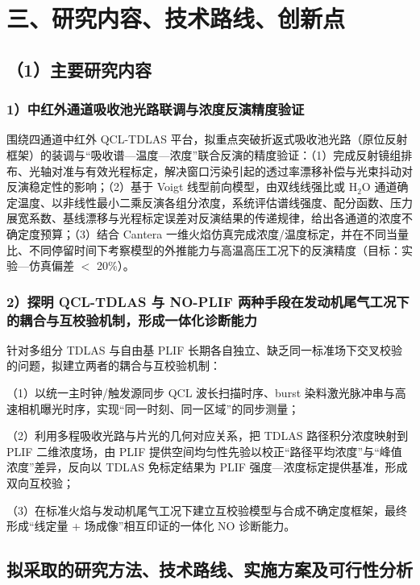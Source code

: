 
\chapter{三、研究内容、技术路线、创新点}

\section{（1）主要研究内容}

\subsection{1）中红外通道吸收池光路联调与浓度反演精度验证}

围绕四通道中红外 QCL-TDLAS 平台，拟重点突破折返式吸收池光路（原位反射框架）的装调与``吸收谱—温度—浓度''联合反演的精度验证：（1）完成反射镜组排布、光轴对准与有效光程标定，解决窗口污染引起的透过率漂移补偿与光束抖动对反演稳定性的影响；（2）基于 Voigt 线型前向模型，由双线线强比或 H$_2$O 通道确定温度、以非线性最小二乘反演各组分浓度，系统评估谱线强度、配分函数、压力展宽系数、基线漂移与光程标定误差对反演结果的传递规律，给出各通道的浓度不确定度预算；（3）结合 Cantera 一维火焰仿真完成浓度/温度标定，并在不同当量比、不同停留时间下考察模型的外推能力与高温高压工况下的反演精度（目标：实验—仿真偏差 $<$ 20\%）。

\subsection{2）探明 QCL-TDLAS 与 NO-PLIF 两种手段在发动机尾气工况下的耦合与互校验机制，形成一体化诊断能力}

针对多组分 TDLAS 与自由基 PLIF 长期各自独立、缺乏同一标准场下交叉校验的问题，拟建立两者的耦合与互校验机制：

（1）以统一主时钟/触发源同步 QCL 波长扫描时序、burst 染料激光脉冲串与高速相机曝光时序，实现``同一时刻、同一区域''的同步测量；

（2）利用多程吸收光路与片光的几何对应关系，把 TDLAS 路径积分浓度映射到 PLIF 二维浓度场，由 PLIF 提供空间均匀性先验以校正``路径平均浓度''与``峰值浓度''差异，反向以 TDLAS 免标定结果为 PLIF 强度—浓度标定提供基准，形成双向互校验；

（3）在标准火焰与发动机尾气工况下建立互校验模型与合成不确定度框架，最终形成``线定量 + 场成像''相互印证的一体化 NO 诊断能力。

\section{拟采取的研究方法、技术路线、实施方案及可行性分析}

